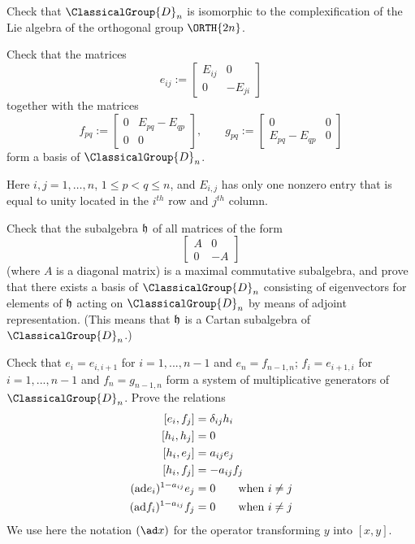 \begin{exercise}
Check that $\ClassicalGroup{D}_{n}$ is isomorphic to the 
complexification of the Lie algebra of the orthogonal 
group $\ORTH{2n}$.
\end{exercise}
\begin{exercise}
Check that the matrices
\begin{equation}
e_{ij}:=\begin{bmatrix}E_{ij}&0\\
0&-E_{ji}
\end{bmatrix}
\end{equation}
together with the matrices
\begin{equation}
f_{pq}:=\begin{bmatrix}0&E_{pq}-E_{qp}\\
0&0
\end{bmatrix},\qquad
g_{pq}:=\begin{bmatrix}0&0\\
E_{pq}-E_{qp}&0
\end{bmatrix}
\end{equation}
form a basis of $\ClassicalGroup{D}_{n}$. 

Here $i,j=1,\ldots,n$, $1\leq p<q\leq n$, and $E_{i,j}$ has only
one nonzero entry that is equal to unity located in the $i^{th}$
row and $j^{th}$ column.
\end{exercise}
\begin{exercise}
Check that the subalgebra $\frak{h}$ of all matrices of the form
\begin{equation}
\begin{bmatrix}
A&0\\
0&-A
\end{bmatrix}
\end{equation}
(where $A$ is a diagonal matrix) is a maximal commutative
subalgebra, and prove that there exists a basis of $\ClassicalGroup{D}_{n}$
consisting of eigenvectors for elements of $\frak{h}$ acting on
$\ClassicalGroup{D}_{n}$ by means of adjoint representation. (This means that
$\frak{h}$ is a Cartan subalgebra of $\ClassicalGroup{D}_{n}$.)
\end{exercise}
\begin{exercise}
Check that $e_{i}=e_{i,i+1}$ for $i=1,...,n-1$ and
$e_{n}=f_{n-1,n}$; $f_{i}=e_{i+1,i}$ for $i=1,...,n-1$ and
$f_{n}=g_{n-1,n}$ form a system of multiplicative generators of
$\ClassicalGroup{D}_{n}$. Prove the relations
\begin{subequations}
\begin{align}
[e_{i},f_{j}]&=\delta_{ij}h_{i}\\
[h_{i},h_{j}]&=0\\
[h_{i},e_{j}]&=a_{ij}e_{j}\\
[h_{i},f_{j}]&=-a_{ij}f_{j}\\
({\rm ad}e_{i})^{1-a_{ij}}e_{j}&=0\qquad\mbox{when $i\not=j$}\\
({\rm ad}f_{i})^{1-a_{ij}}f_{j}&=0\qquad\mbox{when $i\not=j$}
\end{align}
\end{subequations}
We use here the notation $(\ad x)$ for the operator transforming $y$ into $[x,y]$.
\end{exercise}

